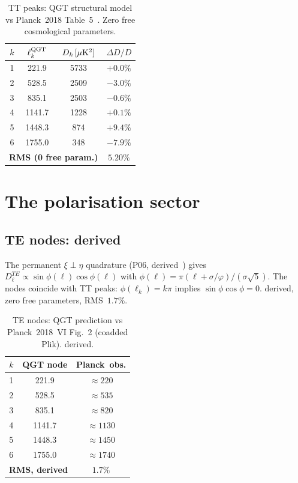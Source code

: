 \documentclass[twocolumn,10pt]{article}
\newcommand{\vp}{\varphi}
\begin{document}
\begin{table}[t]
\centering
\small\renewcommand{\arraystretch}{1.22}
\caption{TT peaks: QGT structural model vs Planck~2018
Table~5~\cite{Planck2018I}. Zero free cosmological parameters.}
\label{tab:TT}
\begin{tabular}{cccc}
\toprule
$k$ & $\ell_k^{\rm QGT}$ & $D_k\,[\mu{\rm K}^2]$ & $\Delta D/D$ \\
\midrule
1 & 221.9 & 5733 & $+0.0\%$ \\
2 & 528.5 & 2509 & $-3.0\%$ \\
3 & 835.1 & 2503 & $-0.6\%$ \\
4 & 1141.7& 1228 & $+0.1\%$ \\
5 & 1448.3& 874  & $+9.4\%$ \\
6 & 1755.0& 348  & $-7.9\%$ \\
\midrule
\multicolumn{3}{l}{\textbf{RMS (0 free param.)}} & $\mathbf{5.20\%}$\\
\bottomrule
\end{tabular}
\end{table}

\section{The polarisation sector}
\label{sec:pol}

\subsection{TE nodes: derived}

The permanent $\xi\perp\eta$ quadrature (P06, derived~\cite{CamP06})
gives $D_\ell^{TE}\propto\sin\phi(\ell)\cos\phi(\ell)$ with
$\phi(\ell)=\pi(\ell+\sigma/\vp)/(\sigma\sqrt{5})$. The nodes
coincide with TT peaks: $\phi(\ell_k)=k\pi$ implies
$\sin\phi\cos\phi=0$. derived, zero free parameters, RMS~$1.7\%$.

\begin{table}[h!]
\centering
\small\renewcommand{\arraystretch}{1.22}
\caption{TE nodes: QGT prediction vs Planck~2018~VI Fig.~2 (coadded
Plik). derived.}
\label{tab:TE}
\begin{tabular}{ccc}
\toprule
$k$ & QGT node & Planck~obs. \\
\midrule
1 & 221.9 & $\approx220$ \\
2 & 528.5 & $\approx535$ \\
3 & 835.1 & $\approx820$ \\
4 & 1141.7& $\approx1130$ \\
5 & 1448.3& $\approx1450$ \\
6 & 1755.0& $\approx1740$ \\
\midrule
\multicolumn{2}{l}{\textbf{RMS, derived}} & $\mathbf{1.7\%}$\\
\bottomrule
\end{tabular}
\end{table}
\end{document}
